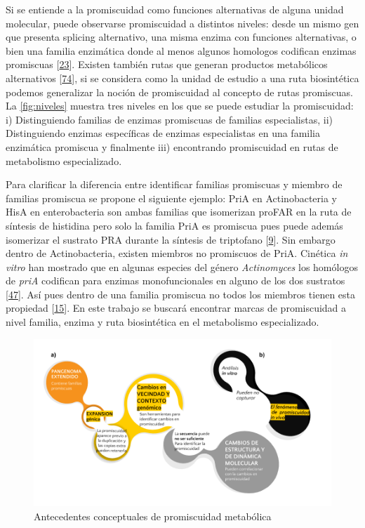 \documentclass[12pt,twoside]{reedthesis}
\begin{document}
  Si se entiende a la promiscuidad como funciones alternativas de alguna
  unidad molecular, puede observarse promiscuidad a distintos niveles:
  desde un mismo gen que presenta splicing alternativo, una misma enzima
  con funciones alternativas, o bien una familia enzimática donde al menos
  algunos homologos codifican enzimas promiscuas
  {[}\protect\hyperlink{ref-nobeli_protein_2009}{23}{]}. Existen también
  rutas que generan productos metabólicos alternativos
  {[}\protect\hyperlink{ref-lamble_archaea_promiscuou_pathways_2003}{74}{]},
  si se considera como la unidad de estudio a una ruta biosintética
  podemos generalizar la noción de promiscuidad al concepto de rutas
  promiscuas. La \autoref{fig:niveles} muestra tres niveles en los que se
  puede estudiar la promiscuidad: i) Distinguiendo familias de enzimas
  promiscuas de familias especialistas, ii) Distinguiendo enzimas
  específicas de enzimas especialistas en una familia enzimática promiscua
  y finalmente iii) encontrando promiscuidad en rutas de metabolismo
  especializado.
  
  Para clarificar la diferencia entre identificar familias promiscuas y
  miembro de familias promiscua se propone el siguiente ejemplo: PriA en
  Actinobacteria y HisA en enterobacteria son ambas familias que
  isomerizan proFAR en la ruta de síntesis de histidina pero solo la
  familia PriA es promiscua pues puede además isomerizar el sustrato PRA
  durante la síntesis de triptofano
  {[}\protect\hyperlink{ref-baronagomez_occurrence_2003}{9}{]}. Sin
  embargo dentro de Actinobacteria, existen miembros no promiscuos de
  PriA. Cinética \emph{in vitro} han mostrado que en algunas especies del
  género \emph{Actinomyces} los homólogos de \emph{priA} codifican para
  enzimas monofuncionales en alguno de los dos sustratos
  {[}\protect\hyperlink{ref-juarez-vazquez_evolution_2017}{47}{]}. Así
  pues dentro de una familia promiscua no todos los miembros tienen esta
  propiedad {[}\protect\hyperlink{ref-bloom_neutral_2007}{15}{]}. En este
  trabajo se buscará encontrar marcas de promiscuidad a nivel familia,
  enzima y ruta biosintética en el metabolismo especializado.
  
  \begin{figure}[h!tbp]
  \centering
  \includegraphics[angle = 0,scale = 0.5]{chapter0/AntecedentesConceptuales.png}
  \caption[Antecedentes conceptuales de promiscuidad metabólica]{\normalsize{Antecedentes conceptuales de promiscuidad metabólica}}
  \label{fig:Antecedentes}
  \end{figure}
  
\end{document}
